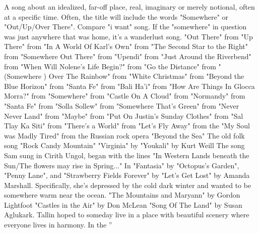 \documentclass[12pt]{book}
\begin{document}
A song about an idealized, far-off place, real, imaginary or merely notional, often at a specific time. Often, the title will include the words "Somewhere" or "Out/Up/Over There". Compare "i want" song. If the "somewhere" in question was just anywhere that was home, it's a wanderlust song. "Out There" from "Up There" from "In A World Of Karl's Own" from "The Second Star to the Right" from "Somewhere Out There" from "Upendi" from "Just Around the Riverbend" from "When Will Nolene's Life Begin?" from "Go the Distance" from "(Somewhere ) Over The Rainbow" from "White Christmas" from "Beyond the Blue Horizon" from "Santa Fe" from "Bali Ha'i" from "How Are Things In Glocca Morra?" from "Somewhere" from "Castle On A Cloud" from "Normandy" from "Santa Fe" from "Solla Sollew" from "Somewhere That's Green" from "Never Never Land" from "Maybe" from "Put On Justin's Sunday Clothes" from "Sal Tlay Ka Siti" from "There's a World" from "Let's Fly Away" from the "My Soul was Madly Tired" from the Russian rock opera "Beyond the Sea" The old folk song "Rock Candy Mountain" "Virginia" by "Youkali" by Kurt Weill The song Sam sung in Cirith Ungol, began with the lines "In Western Lands beneath the Sun/The flowers may rise in Spring..." In "Fantasia" by "Octopus's Garden", "Penny Lane", and "Strawberry Fields Forever" by "Let's Get Lost" by Amanda Marshall. Specifically, she's depressed by the cold dark winter and wanted to be somewhere warm near the ocean. "The Mountains and Maryann" by Gordon Lightfoot "Castles in the Air" by Don McLean "Song Of The Land" by Susan Aglukark. Tallin hoped to someday live in a place with beautiful scenery where everyone lives in harmony. In the ''
\end{document}

